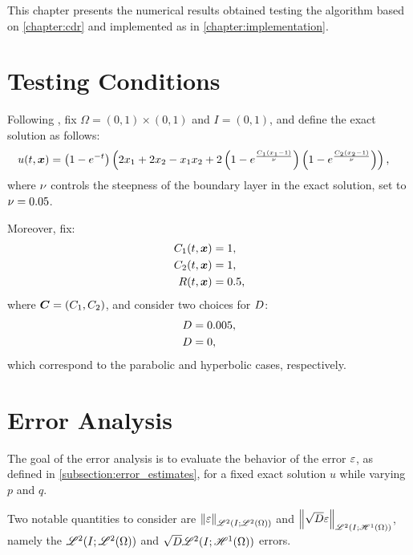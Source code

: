 This chapter presents the numerical results obtained testing the algorithm based on \cref{chapter:cdr} and implemented as in \cref{chapter:implementation}.

\section{Testing Conditions}

Following \cite{Feistauer2007}, fix $\Omega = \left( 0, 1 \right) \times \left( 0, 1 \right)$ and $I = \left( 0, 1 \right)$, and define the exact solution as follows:
\begin{align}
    u(t, \bm{x}) &= \left( 1 - e^{-t} \right) \left( 2 x_1 + 2 x_2 - x_1 x_2 + 2 \left( 1 - e^{\frac{C_1 \left( x_1 - 1 \right) }{\nu}} \right) \left( 1 - e^{\frac{C_2 \left( x_2 - 1 \right) }{\nu}} \right) \right),
\end{align}
where $\nu$ controls the steepness of the boundary layer in the exact solution, set to $\nu = 0.05$.

Moreover, fix:
\begin{align}
    C_1(t, \bm{x}) &= 1, \\
    C_2(t, \bm{x}) &= 1, \\
    R(t, \bm{x}) &= 0.5,
\end{align}
where $\bm{C} = \left( C_1, C_2 \right)$, and consider two choices for $D$:
\begin{align}
    D &= 0.005, \\
    D &= 0,
\end{align}
which correspond to the parabolic and hyperbolic cases, respectively.

\newpage
\section{Error Analysis} \label{section:error_results}

The goal of the error analysis is to evaluate the behavior of the error $\varepsilon$, as defined in \cref{subsection:error_estimates}, for a fixed exact solution $u$ while varying $p$ and $q$.

Two notable quantities to consider are $\left\lVert \varepsilon \right\rVert_{\mathscr{L}^{2}(I; \mathscr{L}^{2}(\Omega))}$ and $\left\lVert \sqrt{D} \varepsilon \right\rVert_{\mathscr{L}^{2}(I; \mathscr{H}^{1}(\Omega))}$, namely the $\mathscr{L}^{2}(I; \mathscr{L}^{2}(\Omega))$ and $\sqrt{D} \mathscr{L}^{2}(I; \mathscr{H}^{1}(\Omega))$ errors.

